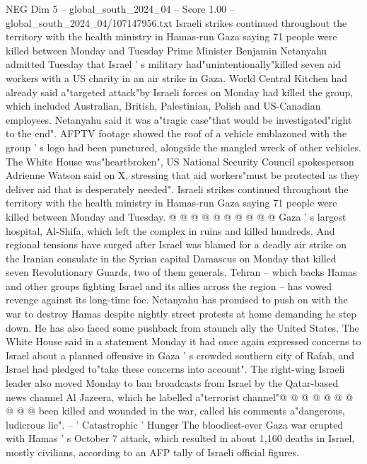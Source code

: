 \begin{textsample}{NEG Dim 5 – global\_south\_2024\_04 – Score 1.00 – global\_south\_2024\_04/107147956.txt}  \label{ex:f5_neg_183}
Israeli strikes continued throughout the territory with the health ministry in Hamas-run Gaza saying 71 people were killed between Monday and Tuesday Prime Minister Benjamin Netanyahu admitted Tuesday that Israel ' s military had"unintentionally"killed seven aid workers with a US charity in an air strike in Gaza.
World Central Kitchen had already said a"targeted attack"by Israeli forces on Monday had killed the group, which included Australian, British, Palestinian, Polish and US-Canadian employees.
Netanyahu said it was a"tragic case"that would be investigated"right to the end".
AFPTV footage showed the roof of a vehicle emblazoned with the group ' s logo had been punctured, alongside the mangled wreck of other vehicles.
The White House was"heartbroken", US National Security Council spokesperson Adrienne Watson said on X, stressing that aid workers"must be protected as they deliver aid that is desperately needed".
Israeli strikes continued throughout the territory with the health ministry in Hamas-run Gaza saying 71 people were killed between Monday and Tuesday. @ @ @ @ @ @ @ @ @ @ Gaza ' s largest hospital, Al-Shifa, which left the complex in ruins and killed hundreds.
And regional tensions have surged after Israel was blamed for a deadly air strike on the Iranian consulate in the Syrian capital Damascus on Monday that killed seven Revolutionary Guards, two of them generals.
Tehran -- which backs Hamas and other groups fighting Israel and its allies across the region -- has vowed revenge against its long-time foe.
Netanyahu has promised to push on with the war to destroy Hamas despite nightly street protests at home demanding he step down.
He has also faced some pushback from staunch ally the United States.
The White House said in a statement Monday it had once again expressed concerns to Israel about a planned offensive in Gaza ' s crowded southern city of Rafah, and Israel had pledged to"take these concerns into account".
The right-wing Israeli leader also moved Monday to ban broadcasts from Israel by the Qatar-based news channel Al Jazeera, which he labelled a"terrorist channel"@ @ @ @ @ @ @ @ @ @ been killed and wounded in the war, called his comments a"dangerous, ludicrous lie". -- ' Catastrophic ' Hunger The bloodiest-ever Gaza war erupted with Hamas ' s October 7 attack, which resulted in about 1,160 deaths in Israel, mostly civilians, according to an AFP tally of Israeli official figures.

\end{textsample}
